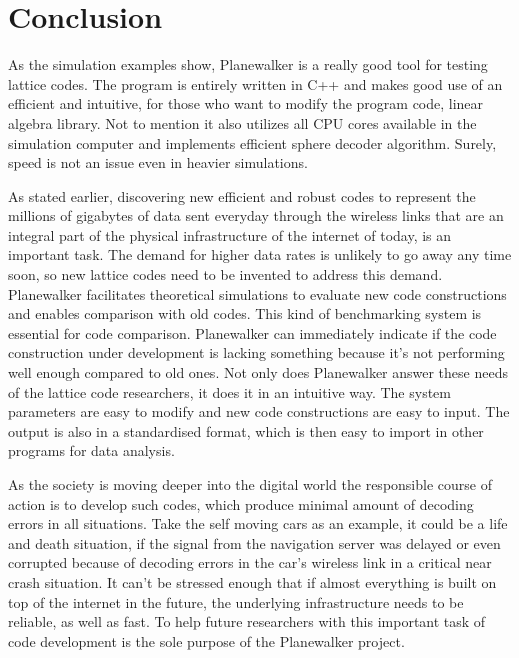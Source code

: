 \documentclass[english,12pt,a4paper,pdftex,sci,utf8]{aaltothesis}
\begin{document}
\section{Conclusion}
\label{sec:conc}
As the simulation examples show, Planewalker is a really good tool for testing lattice codes. The program is entirely written in C++ and makes good use of an efficient and intuitive, for those who want to modify the program code, linear algebra library. Not to mention it also utilizes all CPU cores available in the simulation computer and implements efficient sphere decoder algorithm. Surely, speed is not an issue even in heavier simulations. 
\par As stated earlier, discovering new efficient and robust codes to represent the millions of gigabytes of data sent everyday through the wireless links that are an integral part of the physical infrastructure of the internet of today, is an important task. The demand for higher data rates is unlikely to go away any time soon, so new lattice codes need to be invented to address this demand. Planewalker facilitates theoretical simulations to evaluate new code constructions and enables comparison with old codes. This kind of benchmarking system is essential for code comparison. Planewalker can immediately indicate if the code construction under development is lacking something because it's not performing well enough compared to old ones. Not only does Planewalker answer these needs of the lattice code researchers, it does it in an intuitive way. The system parameters are easy to modify and new code constructions are easy to input. The output is also in a standardised format, which is then easy to import in other programs for data analysis.
\par As the society is moving deeper into the digital world the responsible course of action is to develop such codes, which produce minimal amount of decoding errors in all situations. Take the self moving cars as an example, it could be a life and death situation, if the signal from the navigation server was delayed or even corrupted because of decoding errors in the car's wireless link in a critical near crash situation. It can't be stressed enough that if almost everything is built on top of the internet in the future, the underlying infrastructure needs to be reliable, as well as fast. To help future researchers with this important task of code development is the sole purpose of the Planewalker project.

\clearpage
\end{document}
